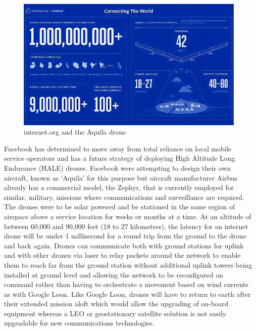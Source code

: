 \begin{figure}[ht]
\centering
\includegraphics[scale=0.5]{figures/AquilaStats.png}
\caption{internet.org and the Aquila drone\cite{RefWorks:358}}
\label{fig:Aquila}
\end{figure}

Facebook has determined to move away from total reliance on local mobile service operators and has a future strategy of deploying High Altitude Long Endurance (HALE) drones. Facebook were attempting to design their own aircraft, known as `Aquila' for this purpose but aircraft manufacturer Airbus already has a commercial model, the Zephyr, that is currently employed for similar, military, missions where communications and surveillance are required\cite{RefWorks:358}. The drones were to  be solar powered and be stationed in the same region of airspace above a service location for weeks or months at a time. At an altitude of between 60,000 and 90,000 feet (18 to 27 kilometres), the latency for an internet drone will be under 1 millisecond for a round trip from the ground to the drone and back again. Drones can communicate both with ground stations for uplink and with other drones via laser to relay packets around the network to enable them to reach far from the ground station without additional uplink towers being installed at ground level and allowing the network to be reconfigured on command rather than having to orchestrate a movement based on wind currents as with Google Loon. Like Google Loon, drones will have to return to earth after their extended mission aloft which would allow the upgrading of on-board equipment whereas a LEO or geostationary satellite solution is not easily upgradable for new communications technologies.

